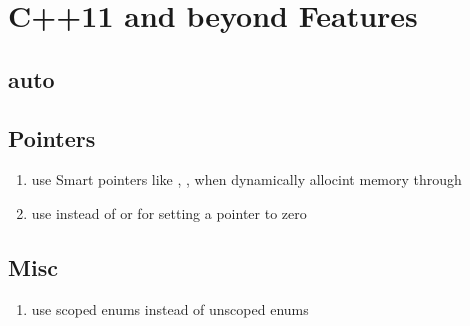 \section{C++11 and beyond Features }
\subsection{auto}

\subsection{Pointers}
\begin{enumerate}
\item use Smart pointers like , ,  when dynamically allocint memory through 
\item use  instead of  or  for setting a pointer to zero
\end{enumerate}

\subsection{Misc}
\begin{enumerate}
\item use scoped enums instead of unscoped enums
\end{enumerate}